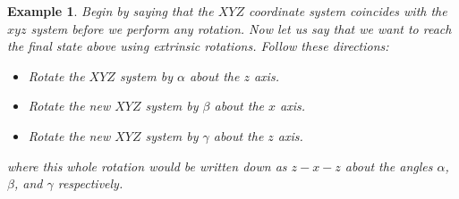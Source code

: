 \documentclass[12pt, letterpaper, onecolumn, conference, final]{IEEEtran}
\theoremstyle{definition}
\newtheorem{definition}{Definition}
\theoremstyle{plain}
\newtheorem{example}{Example}
\begin{document}
\begin{example}
Begin by saying that the $XYZ$ coordinate system coincides with the $xyz$ system before we perform any rotation. Now let us say that we want to reach the final state above using extrinsic rotations. Follow these directions:
\begin{itemize}

\item
Rotate the $XYZ$ system by $\alpha$ about the $z$ axis.

\item
Rotate the new $XYZ$ system by $\beta$ about the $x$ axis.

\item
Rotate the new $XYZ$ system by $\gamma$ about the $z$ axis.

\end{itemize}
where this whole rotation would be written down as $z-x-z$ about the angles $\alpha$, $\beta$, and $\gamma$ respectively.
\end{example}

\vspace{.3cm}
\begin{center}
\end{center}

\begin{center}
\end{center}
\end{document}
